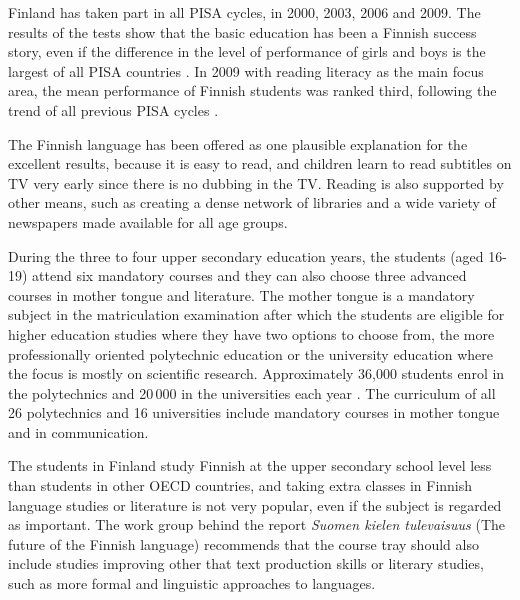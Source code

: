 \begin{multicols}{2}
Finland has taken part in all PISA cycles, in 2000, 2003, 2006 and 2009.  The results of the tests show that the basic education has been a Finnish success story, even if the difference in the level of performance of girls and boys is the largest of all PISA countries \cite{Literacy}. In 2009 with reading literacy as the main focus area, the mean performance of Finnish students was ranked third, following the trend of all previous PISA cycles \cite{Pisa2006}.


The Finnish language has been offered as one plausible explanation for the excellent results, because it is easy to read, and children learn to read subtitles on TV very early since there is no dubbing in the TV. Reading is also supported by other means, such as creating a dense network of libraries and a wide variety of newspapers made available for all age groups.

During the three to four upper secondary education years, the students (aged 16-19) attend six mandatory courses and they can also choose three advanced courses in mother tongue and literature. The mother tongue is a mandatory subject in the matriculation examination after which the students are eligible for higher education studies where they have two options to choose from, the more professionally oriented polytechnic education or the university education where the focus is mostly on scientific research. Approximately 36,000 students enrol in the polytechnics and 20\,000 in the universities each year \cite{Education}. The curriculum of all 26 polytechnics and 16 universities include mandatory courses in mother tongue and in communication.


The students in Finland study Finnish at the upper secondary school level less than students in other OECD countries, and taking extra classes in Finnish language studies or literature is not very popular, even if the subject is regarded as important. The work group behind the report \textit{\foreignlanguage{finnish}{Suomen kielen tulevaisuus}} (The future of the Finnish language) \cite{Tulevaisuus2009} recommends that the course tray should also include studies improving other that text production skills or literary studies, such as more formal and linguistic approaches to languages.


\end{multicols}
